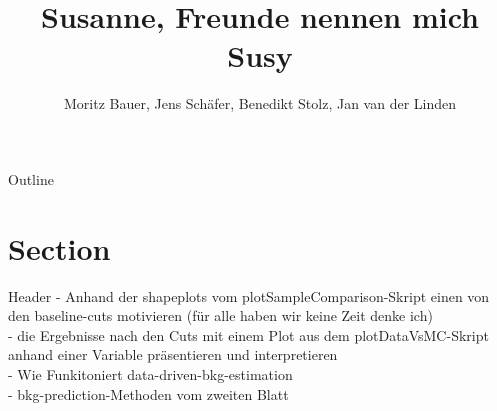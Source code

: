 \documentclass[18pt]{beamer}
\title[SUSY]{Susanne, Freunde nennen mich Susy}
\author{Moritz Bauer, Jens Schäfer, Benedikt Stolz, Jan van der Linden}
\institute{Institut für Experimentelle Teilchenphysik (ETP)}
\begin{document}

\begin{frame}
\titlepage
\end{frame}


\begin{frame}{Outline}
\tableofcontents

\end{frame}



\section{Section}
\begin{frame}{Header}
- Anhand der shapeplots vom plotSampleComparison-Skript einen von den baseline-cuts motivieren (für alle haben wir keine Zeit denke ich)\\
- die Ergebnisse nach den Cuts mit einem Plot aus dem plotDataVsMC-Skript anhand einer Variable präsentieren und interpretieren\\
- Wie Funkitoniert data-driven-bkg-estimation\\
- bkg-prediction-Methoden vom zweiten Blatt

\end{frame}
\end{document}
